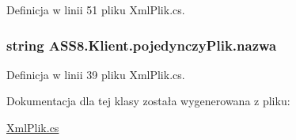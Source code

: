 Definicja w linii 51 pliku XmlPlik.cs.\hypertarget{a00020_f792807be9c86aacf7306b9365c2436e}{
\subsubsection[{nazwa}]{\setlength{\rightskip}{0pt plus 5cm}string ASS8.Klient.pojedynczyPlik.nazwa}}
\label{db/db2/a00020_f792807be9c86aacf7306b9365c2436e}




Definicja w linii 39 pliku XmlPlik.cs.

Dokumentacja dla tej klasy została wygenerowana z pliku:\begin{CompactItemize}
\item 
\hyperlink{a00054}{XmlPlik.cs}\end{CompactItemize}
